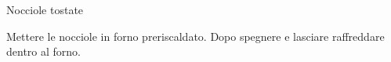 \begin{recipe}{Nocciole tostate}
    \begin{ingredients}
    \end{ingredients}
    
    \begin{preparation}
        \step Mettere le nocciole in forno preriscaldato.
        \step Dopo  spegnere e lasciare raffreddare dentro al forno.
    \end{preparation}
\end{recipe}
